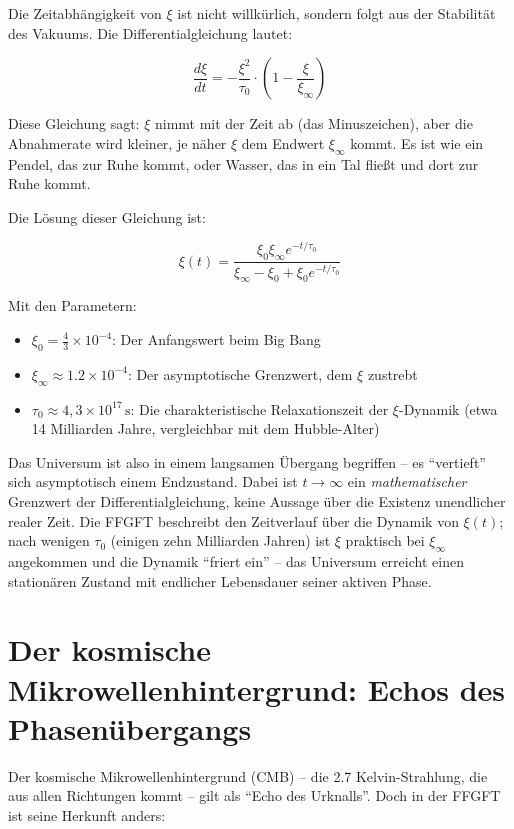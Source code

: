 Die Zeitabhängigkeit von $\xi$ ist nicht willkürlich, sondern folgt aus der Stabilität des Vakuums. Die Differentialgleichung lautet:

\begin{equation}
\frac{d\xi}{dt} = -\frac{\xi^2}{\tau_0} \cdot \left(1 - \frac{\xi}{\xi_{\infty}}\right)
\end{equation}

Diese Gleichung sagt: $\xi$ nimmt mit der Zeit ab (das Minuszeichen), aber die Abnahmerate wird kleiner, je näher $\xi$ dem Endwert $\xi_{\infty}$ kommt. Es ist wie ein Pendel, das zur Ruhe kommt, oder Wasser, das in ein Tal fließt und dort zur Ruhe kommt.

Die Lösung dieser Gleichung ist:

\begin{equation}
\xi(t) = \frac{\xi_0 \xi_{\infty} e^{-t/\tau_0}}{\xi_{\infty} - \xi_0 + \xi_0 e^{-t/\tau_0}}
\end{equation}

Mit den Parametern:
\begin{itemize}[leftmargin=*]
\item $\xi_0 = \frac{4}{3} \times 10^{-4}$: Der Anfangswert beim Big Bang
\item $\xi_{\infty} \approx 1.2 \times 10^{-4}$: Der asymptotische Grenzwert, dem $\xi$ zustrebt
\item $\tau_0 \approx 4{,}3 \times 10^{17} \, \text{s}$: Die charakteristische Relaxationszeit der $\xi$-Dynamik (etwa 14 Milliarden Jahre, vergleichbar mit dem Hubble-Alter)
\end{itemize}

Das Universum ist also in einem langsamen Übergang begriffen -- es \enquote{vertieft} sich asymptotisch einem Endzustand. Dabei ist $t \to \infty$ ein \textit{mathematischer} Grenzwert der Differentialgleichung, keine Aussage über die Existenz unendlicher realer Zeit. Die FFGFT beschreibt den Zeitverlauf über die Dynamik von $\xi(t)$; nach wenigen $\tau_0$ (einigen zehn Milliarden Jahren) ist $\xi$ praktisch bei $\xi_\infty$ angekommen und die Dynamik \enquote{friert ein} -- das Universum erreicht einen stationären Zustand mit endlicher Lebensdauer seiner aktiven Phase.

\section{Der kosmische Mikrowellenhintergrund: Echos des Phasenübergangs}

Der kosmische Mikrowellenhintergrund (CMB) -- die 2.7 Kelvin-Strahlung, die aus allen Richtungen kommt -- gilt als \enquote{Echo des Urknalls}. Doch in der FFGFT ist seine Herkunft anders:

